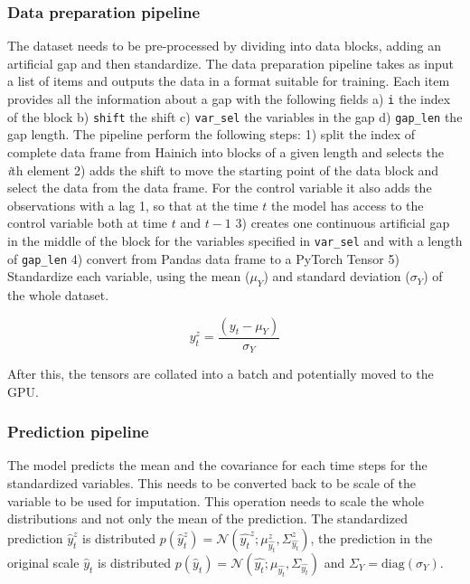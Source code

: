 \documentclass{article}
\newcommand{\norm}[3]{\mathcal{N}\left(#1; #2, #3\right)} %
\begin{document}
\pagebreak

\subsubsection{Data preparation pipeline}

The dataset needs to be pre-processed by dividing into data blocks, adding an artificial gap and then standardize. The data preparation pipeline takes as input a list of items and outputs the data in a format suitable for training. Each item provides all the information about a gap with the following fields a) \verb|i| the index of the block b) \verb|shift|  the shift c) \verb|var_sel| the variables in the gap d) \verb|gap_len| the gap length. The pipeline perform the following steps: 1) split the index of complete data frame from Hainich into blocks of a given length and selects the \textit{i}th element  2) adds the shift to move the starting point of the data block and select the data from the data frame. For the control variable it also adds the observations with a lag 1, so that at the time $t$ the model has access to the control variable both at time $t$ and $t-1$ 3) creates one continuous artificial gap in the middle of the block for the variables specified in \verb|var_sel| and with a length of \verb|gap_len| 4) convert from Pandas data frame to a PyTorch Tensor 5) Standardize each variable, using the mean ($\mu_Y$) and standard deviation ($\sigma_Y$) of the whole dataset.

\begin{equation}\label{standardized}
    y^z_t = \frac{(y_t - \mu_Y)}{\sigma_Y}
\end{equation}

After this, the tensors are collated into a batch and potentially moved to the GPU.

\subsubsection{Prediction pipeline}

The model predicts the mean and the covariance for each time steps for the standardized variables. This needs to be converted back to be scale of the variable to be used for imputation. This operation needs to scale the whole distributions and not only the mean of the prediction. The standardized prediction $\hat{y}^z_t$ is distributed $p(\hat{y}^z_t) = \norm{\hat{y_t}^z}{\mu^z_{\hat{y_t}}}{\Sigma^z_{\hat{y_t}}}$, the prediction in the original scale $\hat{y}_t$ is distributed $p(\hat{y}_t) =  \norm{\hat{y_t}}{\mu_{\hat{y_t}}}{\Sigma_{\hat{y_t}}}$ and $\Sigma_Y = \text{diag}(\sigma_Y)$. 
\end{document}
